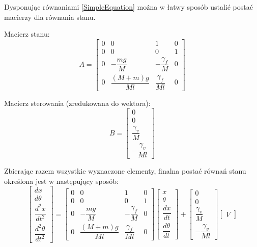\documentclass[12pt, oneside]{report}
\theoremstyle{definition}
\begin{document}
Dysponując równaniami \ref{SimpleEquation} można w łatwy sposób ustalić postać macierzy dla równania stanu.

Macierz stanu:
\begin{equation}
A = 
\begin{bmatrix}
    0 & 0                  & 1                    & 0 \\
    0 & 0                  & 0                    & 1 \\
    0 & -\dfrac{mg}{M}     & -\dfrac{\gamma_f}{M} & 0 \\[8pt]
    0 & \dfrac{(M+m)g}{Ml} & \dfrac{\gamma_f}{Ml} & 0
\end{bmatrix}
\end{equation}

Macierz sterowania (zredukowana do wektora):
\begin{equation}
B = 
\begin{bmatrix}
    0 \\
    0 \\
    \dfrac{\gamma_v}{M} \\[8pt]
    -\dfrac{\gamma_v}{Ml}
\end{bmatrix}
\end{equation}

Zbierając razem wszystkie wyznaczone elementy, finalna postać równań stanu określona jest w następujący sposób:
\begin{equation}
\begin{bmatrix}
dx \\ 
d\theta \\ 
\dfrac{d^2x}{dt^2} \\[8pt] 
\dfrac{d^2\theta}{dt^2}
\end{bmatrix}
= 
\begin{bmatrix}
    0 & 0                  & 1                    & 0 \\
    0 & 0                  & 0                    & 1 \\
    0 & -\dfrac{mg}{M}     & -\dfrac{\gamma_f}{M} & 0 \\[8pt]
    0 & \dfrac{(M+m)g}{Ml} & \dfrac{\gamma_f}{Ml} & 0
\end{bmatrix}
\begin{bmatrix}
x \\ 
\theta \\ 
\dfrac{dx}{dt} \\[8pt] 
\dfrac{d\theta}{dt}
\end{bmatrix}
+
\begin{bmatrix}
    0 \\
    0 \\
    \dfrac{\gamma_v}{M} \\[8pt]
    -\dfrac{\gamma_v}{Ml}
\end{bmatrix}
\begin{bmatrix}
V
\end{bmatrix}
\end{equation}
\end{document}
